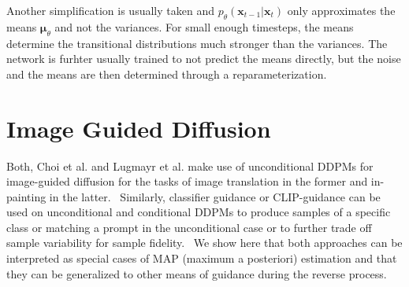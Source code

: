 Another simplification is usually taken and $p_{\theta}(\bm{x}_{t-1} | \bm{x}_t)$ only approximates the means $\bm{\mu}_{\theta}$ and not the variances. For small enough timesteps, the means determine the transitional distributions much stronger than the variances. The network is furhter usually trained to not predict the means directly, but the noise and the means are then determined through a reparameterization.~\autocite{ho2020denoising,nichol2021improved}

\section{Image Guided Diffusion}
Both, Choi et al. and Lugmayr et al. make use of unconditional DDPMs for image-guided diffusion for the tasks of image translation in the former and in-painting in the latter.~\autocite{choi2021ilvr,lugmayr2022repaint} Similarly, classifier guidance or CLIP-guidance can be used on unconditional and conditional DDPMs to produce samples of a specific class or matching a prompt in the unconditional case or to further trade off sample variability for sample fidelity.~\autocite{dhariwal2021diffusion} We show here that both approaches can be interpreted as special cases of MAP (maximum a posteriori) estimation and that they can be generalized to other means of guidance during the reverse process.
